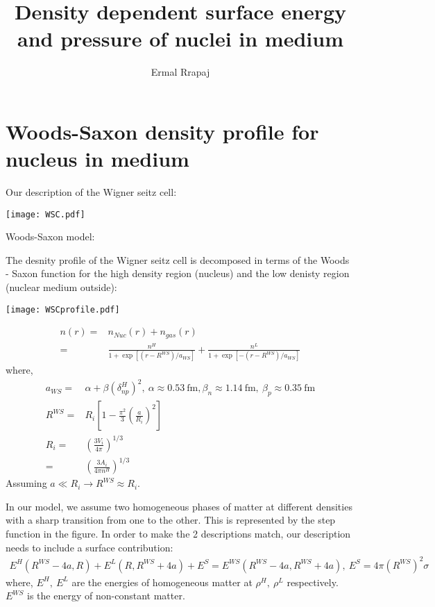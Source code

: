 \documentclass[11pt,letter]{article}
\title{Density dependent surface energy and pressure of nuclei in medium}
\author{Ermal Rrapaj}
\date{} %
\begin{document}
\maketitle


\section{Woods-Saxon density profile for nucleus in medium}
Our description of the Wigner seitz cell:
\begin{center}
 \texttt{[image: WSC.pdf]}
\end{center}

Woods-Saxon model:

The desnity profile of the Wigner seitz cell is decomposed in terms of the Woods - Saxon function for the high density region (nucleus) and the low denisty 
region (nuclear medium outside):
\begin{center}
 \texttt{[image: WSCprofile.pdf]}
\end{center}
\begin{equation}
 \begin{split}
  n(r) = & n_{Nuc}(r)+n_{gas}(r) \\
  =&\frac{n^{H}}{1+\exp[(r-R^{WS})/a_{WS}]} + \frac{n^{L}}{1+\exp[-(r-R^{WS})/a_{WS}]} 
 \end{split}
\end{equation}
where,
\begin{equation}
 \begin{split}
  a_{WS} =& \alpha + \beta (\delta^{H}_{np})^2,\ \alpha \approx 0.53\ \text{fm}, \beta_n \approx 1.14\ \text{fm},\ \beta_p \approx 0.35\ \text{fm} \\
  R^{WS} =& R_{i}[1-\frac{\pi^2}{3}(\frac{a}{R_i})^2]\\
  R_i =& (\frac{3 V_i}{4\pi})^{1/3}\\
  =& (\frac{3 A_i}{4\pi n^H})^{1/3}
 \end{split}
\end{equation}
Assuming $a \ll R_i \rightarrow R^{WS}\approx R_i$. 

In our model, we assume two homogeneous phases of matter at different densities with a sharp transition from one to the other.
This is represented by the step function in the figure.
In order to make the 2 descriptions match, our description needs to include a surface contribution:
\begin{equation}
 \begin{split}
  E^H(R^{WS}-4a,R)+E^L(R,R^{WS}+4a)+E^{S}=E^{WS}(R^{WS}-4a,R^{WS}+4a),\ E^{S} = 4\pi (R^{WS})^2 \sigma
 \end{split}
\end{equation}
where, $E^H,\ E^L$ are the energies of homogeneous matter at $\rho^H,\ \rho^L$ respectively. $E^{WS}$ is the 
energy of non-constant matter.
\end{document}
